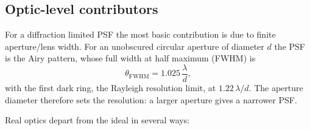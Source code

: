 \documentclass[11pt]{book}
\begin{document}
\subsection{Optic-level contributors}

For a diffraction limited PSF the most basic contribution is due to finite aperture/lens width. For an unobscured circular aperture of diameter $d$ the PSF is the Airy pattern, whose full width at half maximum (FWHM) is
\begin{equation}
\theta_{\mathrm{FWHM}} = 1.025\,\frac{\lambda}{d},
\label{eq:airy}
\end{equation}
with the first dark ring, the Rayleigh resolution limit, at $1.22\,\lambda/d$. The aperture diameter therefore sets the resolution: a larger aperture gives a narrower PSF.

Real optics depart from the ideal in several ways:
\end{document}
